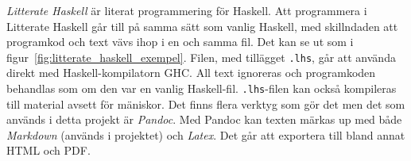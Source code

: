 \begin{draft}
\textit{Litterate Haskell} är literat programmering för Haskell.\cite{litterate_haskell}
Att programmera i Litterate Haskell går till på samma sätt som vanlig Haskell,
med skillndaden att programkod och text vävs ihop i en och samma fil. Det kan
se ut som i figur~\ref{fig:litterate_haskell_exempel}. Filen, med tillägget
\texttt{.lhs}, går att använda direkt med Haskell-kompilatorn GHC. All text
ignoreras och programkoden behandlas som om den var en vanlig
Haskell-fil. \texttt{.lhs}-filen kan också kompileras till material avsett för
mäniskor. Det finns flera verktyg som gör det men det som används i detta
projekt är \textit{Pandoc}\cite{pandoc}. Med Pandoc kan texten märkas
up med både \textit{Markdown} (används i projektet) och \textit{Latex}. Det går
att exportera till bland annat HTML och PDF.
\end{draft}

